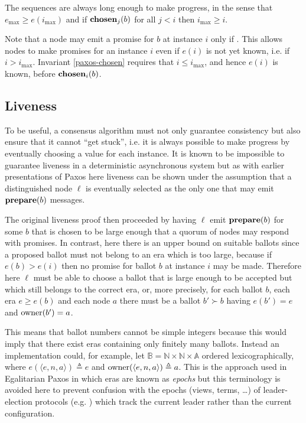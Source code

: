 \documentclass[journal]{IEEEtran}
\begin{document}
The sequences are always long enough to make progress, in the sense that
$e_\mathrm{max} \ge e(i_\mathrm{max})$ and if $\mathbf{chosen}_{j}(b)$ for all $j < i$
then $i_\mathrm{max} \ge i$.

Note that a node may emit a promise for $b$ at instance $i$ only if
\promiseEraOk. This allows nodes to make promises for an instance $i$ even if
$e(i)$ is not yet known, i.e. if $i > i_\mathrm{max}$. Invariant
\ref{paxos-chosen} requires that $i \le i_\mathrm{max}$, and hence $e(i)$ is
known, before $\mathbf{chosen}_{i}(b)$.

\subsection{Liveness}\label{liveness}

To be useful, a consensus algorithm must not only guarantee consistency but
also ensure that it cannot ``get stuck'', i.e. it is always possible to make
progress by eventually choosing a value for each instance. It is known to be
impossible to guarantee liveness in a deterministic asynchronous
system\cite{flp-impossibility} but as with earlier presentations of
Paxos\cite{paxos-made-simple} here liveness can be shown under the assumption
that a distinguished node $\ell$ is eventually selected as the only one that
may emit $\mathbf{prepare}(b)$ messages.

The original liveness proof then proceeded by having $\ell$ emit $\mathbf{prepare}(b)$ for
some $b$ that is chosen to be large enough that a quorum of nodes may respond
with promises. In contrast, here there is an upper bound on suitable ballots
since a proposed ballot must not belong to an era which is too large, because
if ${e(b) > e(i)}$ then no promise for ballot $b$ at instance $i$ may be made.
Therefore here $\ell$ must be able to choose a ballot that is large enough to
be accepted but which still belongs to the correct era, or, more precisely, for
each ballot $b$, each era $e \ge e(b)$ and each node $a$ there must be a ballot
$b' \succ b$ having $e(b') = e$ and $\mathrm{owner}(b') = a$.

This means that ballot numbers cannot be simple integers because this would
imply that there exist eras containing only finitely many ballots. Instead an
implementation could, for example, let $\mathbb B = \mathbb N \times \mathbb N
\times \mathbb A$ ordered lexicographically, where $e(\langle e, n, a\rangle)
\triangleq e$ and $\mathrm{owner}(\langle e, n, a \rangle) \triangleq a$. This is the
approach used in Egalitarian Paxos\cite{egalitarian-paxos} in which eras are
known as \textit{epochs} but this terminology is avoided here to prevent
confusion with the epochs (views, terms, \ldots) of leader-election protocols
(e.g.  \cite{omega-meets-paxos}) which track the current leader rather than the
current configuration.
\end{document}
